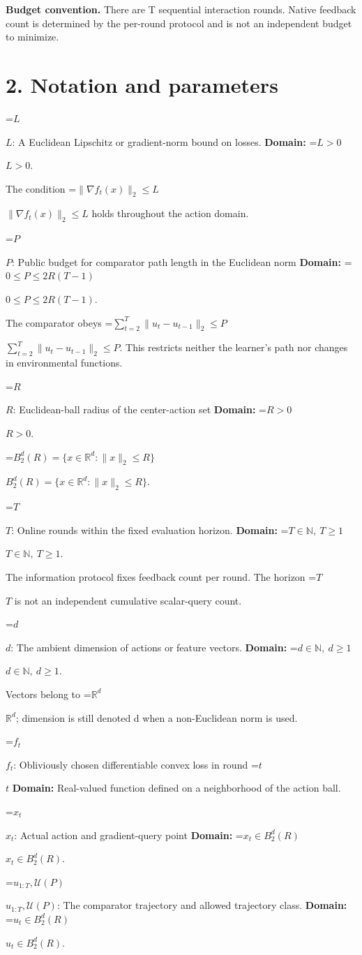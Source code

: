 \documentclass[10pt,a4paper]{article}
\newcommand{\AtlasMath}[1]{\par\begingroup\centering\setbox0=\hbox{$\displaystyle #1$}\ifdim\wd0>1.4\linewidth\typeout{ATLAS WIDE FORMULA: \the\wd0}\fi\ifdim\wd0>\linewidth\resizebox{\linewidth}{!}{\box0}\else\box0\fi\par\endgroup}
\newcommand{\AtlasInlineMath}[1]{\begingroup\setbox0=\hbox{$#1$}\ifdim\wd0>.4\linewidth\endgroup\AtlasMath{#1}\else\endgroup$#1$\fi}
\begin{document}
\textbf{Budget convention.} There are T sequential interaction rounds. Native feedback count is determined by the per-round protocol and is not an independent budget to minimize.

\section{2. Notation and parameters}
\AtlasInlineMath{L}: A Euclidean Lipschitz or gradient-norm bound on losses. \textbf{Domain:} \AtlasInlineMath{L>0}.

The condition \AtlasInlineMath{\|\nabla f_t(x)\|_2\le L} holds throughout the action domain.

\AtlasInlineMath{P}: Public budget for comparator path length in the Euclidean norm \textbf{Domain:} \AtlasInlineMath{0\le P\le2R(T-1)}.

The comparator obeys \AtlasInlineMath{\sum_{t=2}^T\|u_t-u_{t-1}\|_2\le P}. This restricts neither the learner's path nor changes in environmental functions.

\AtlasInlineMath{R}: Euclidean-ball radius of the center-action set \textbf{Domain:} \AtlasInlineMath{R>0}.

\AtlasInlineMath{B_2^d(R)=\{x\in\mathbb R^d:\|x\|_2\le R\}}.

\AtlasInlineMath{T}: Online rounds within the fixed evaluation horizon. \textbf{Domain:} \AtlasInlineMath{T\in\mathbb N,\ T\ge1}.

The information protocol fixes feedback count per round. The horizon \AtlasInlineMath{T} is not an independent cumulative scalar-query count.

\AtlasInlineMath{d}: The ambient dimension of actions or feature vectors. \textbf{Domain:} \AtlasInlineMath{d\in\mathbb N,\ d\ge1}.

Vectors belong to \AtlasInlineMath{\mathbb R^d}; dimension is still denoted d when a non-Euclidean norm is used.

\AtlasInlineMath{f_t}: Obliviously chosen differentiable convex loss in round \AtlasInlineMath{t} \textbf{Domain:} Real-valued function defined on a neighborhood of the action ball.

\AtlasInlineMath{x_t}: Actual action and gradient-query point \textbf{Domain:} \AtlasInlineMath{x_t\in B_2^d(R)}.

\AtlasInlineMath{u_{1:T},\mathcal U(P)}: The comparator trajectory and allowed trajectory class. \textbf{Domain:} \AtlasInlineMath{u_t\in B_2^d(R)}.
\end{document}
